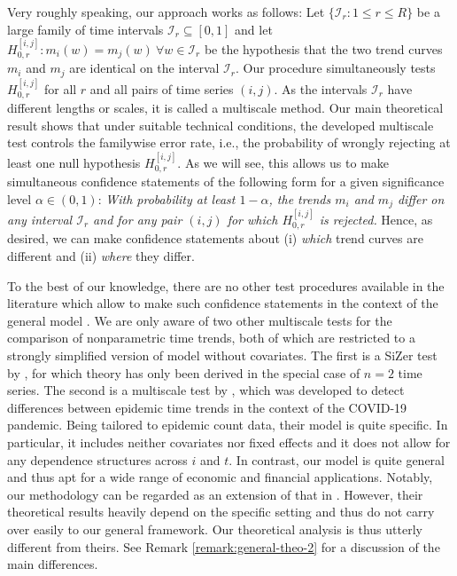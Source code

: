 \documentclass[12pt]{article}
\makeatletter
\renewcommand{\eqref}[1]{\tagform@{\ref{#1}}}
\makeatother
\begin{document}
Very roughly speaking, our approach works as follows: Let $\{\mathcal{I}_r: 1 \le r \le R\}$ be a large family of time intervals $\mathcal{I}_r \subseteq [0,1]$ and let $H_{0,r}^{[i,j]}: m_i(w) = m_j(w) \ \forall w \in \mathcal{I}_r$ be the hypothesis that the two trend curves $m_i$ and $m_j$ are identical on the interval $\mathcal{I}_r$. Our procedure simultaneously tests $H_{0,r}^{[i, j]}$ for all $r$ and all pairs of time series $(i,j)$. As the intervals $\mathcal{I}_r$ have different lengths or scales, it is called a multiscale method. Our main theoretical result shows that under suitable technical conditions, the developed multiscale test controls the familywise error rate, i.e., the probability of wrongly rejecting at least one null hypothesis $H_{0,r}^{[i, j]}$. As we will see, this allows us to make simultaneous confidence statements of the following form for a given significance level $\alpha \in (0,1)$: 
\textit{With probability at least $1-\alpha$, the trends $m_i$ and $m_j$ differ on any interval $\mathcal{I}_r$ and for any pair $(i,j)$ for which $H_{0,r}^{[i, j]}$ is rejected.} 
Hence, as desired, we can make confidence statements about (i) \textit{which} trend curves are different and (ii) \textit{where} they differ.


To the best of our knowledge, there are no other test procedures available in the literature which allow to make such confidence statements in the context of the general model \eqref{eq:model_full}. We are only aware of two other multiscale tests for the comparison of nonparametric time trends, both of which are restricted to a strongly simplified version of model \eqref{eq:model_full} without covariates. The first is a SiZer test by \cite{Park2009}, for which theory has only been derived in the special case of $n=2$ time series. The second is a multiscale test by \cite{KhismatullinaVogt2023}, which was developed to detect differences between epidemic time trends in the context of the COVID-19 pandemic. Being tailored to epidemic count data, their model is quite specific. In particular, it includes neither covariates nor fixed effects and it does not allow for any dependence structures across $i$ and $t$. In contrast, our model is quite general and thus apt for a wide range of economic and financial applications. Notably, our methodology can be regarded as an extension of that in \cite{KhismatullinaVogt2023}. However, their theoretical results heavily depend on the specific setting and thus do not carry over easily to our general framework. Our theoretical analysis is thus utterly different from theirs. See Remark \ref{remark:general-theo-2} for a discussion of the main differences. 
\end{document}
